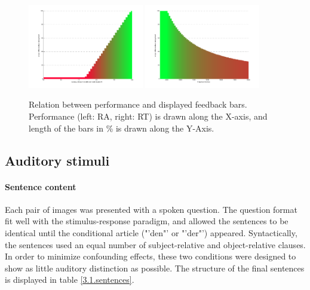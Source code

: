 \begin{figure}[h]
\begin{center}
\vspace{7mm}
\includegraphics[width=0.45\textwidth]{pics/3_1_feedbackGraphAccuracy}
\includegraphics[width=0.45\textwidth]{pics/3_1_feedbackGraphRT}
\caption{\label{3.1.feedbackGraphs} Relation between performance and displayed feedback bars. Performance (left: RA, right: RT) is drawn along the X-axis, and length of the bars in \% is drawn along the Y-Axis.}
\end{center}
\end{figure}

\subsection{Auditory stimuli}\label{3.1.stimuli.auditory}

\paragraph{Sentence content}
Each pair of images was presented with a spoken question.
The question format fit well with the stimulus-response paradigm, and allowed the sentences to be identical until the conditional article ("'den"' or "'der"') appeared.
Syntactically, the sentences used an equal number of subject-relative and object-relative clauses.
In order to minimize confounding effects, these two conditions were designed to show as little auditory distinction as possible.
The structure of the final sentences is displayed in table \ref{3.1.sentences}.


